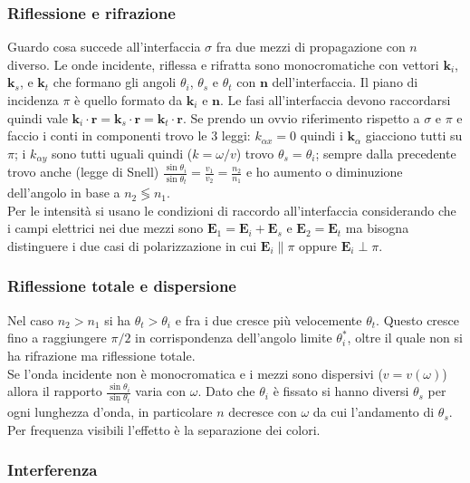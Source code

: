 \documentclass[11pt,a4paper]{article}
\begin{document}
\subsubsection{Riflessione e rifrazione}
Guardo cosa succede all'interfaccia $\sigma$ fra due mezzi di propagazione con $n$ diverso. Le onde incidente, riflessa e rifratta sono monocromatiche con vettori $\mathbf k_i$, $\mathbf k_s$, e $\mathbf k_t$ che formano gli angoli $\theta_i$, $\theta_s$ e $\theta_t$ con $\mathbf n$ dell'interfaccia. Il piano di incidenza $\pi$ è quello formato da $\mathbf k_i$ e $\mathbf n$. Le fasi all'interfaccia devono raccordarsi quindi vale $\mathbf k_i \cdot \mathbf r = \mathbf k_s \cdot \mathbf r = \mathbf k_t \cdot \mathbf r$. Se prendo un ovvio riferimento rispetto a $\sigma$ e $\pi$ e faccio i conti in componenti trovo le 3 leggi: $k_{\alpha x} = 0$ quindi i $\mathbf k_\alpha$ giacciono tutti su $\pi$; i $k_{\alpha y}$ sono tutti uguali quindi ($k = \omega/v$) trovo $\theta_s = \theta_i$; sempre dalla precedente trovo anche (legge di Snell) $\frac{\sin\theta_i}{\sin\theta_t} = \frac{v_1}{v_2} = \frac{n_2}{n_1}$ e ho aumento o diminuzione dell'angolo in base a $n_2 \lessgtr n_1$.\\
Per le intensità si usano le condizioni di raccordo all'interfaccia considerando che i campi elettrici nei due mezzi sono $\mathbf E_1 = \mathbf E_i + \mathbf E_s$ e $\mathbf E_2 = \mathbf E_t$ ma bisogna distinguere i due casi di polarizzazione in cui $\mathbf E_i \parallel \pi$ oppure $\mathbf E_i \perp \pi$.

\subsubsection{Riflessione totale e dispersione}
Nel caso $n_2 > n_1$ si ha $\theta_t > \theta_i$ e fra i due cresce più velocemente $\theta_t$. Questo cresce fino a raggiungere $\pi/2$ in corrispondenza dell'angolo limite $\theta_i^*$, oltre il quale non si ha rifrazione ma riflessione totale.\\
Se l'onda incidente non è monocromatica e i mezzi sono dispersivi ($v = v(\omega)$) allora il rapporto $\frac{\sin\theta_i}{\sin\theta_t}$ varia con $\omega$. Dato che $\theta_i$ è fissato si hanno diversi $\theta_s$ per ogni lunghezza d'onda, in particolare $n$ decresce con $\omega$ da cui l'andamento di $\theta_s$. Per frequenza visibili l'effetto è la separazione dei colori.

\subsubsection{Interferenza}
\end{document}
